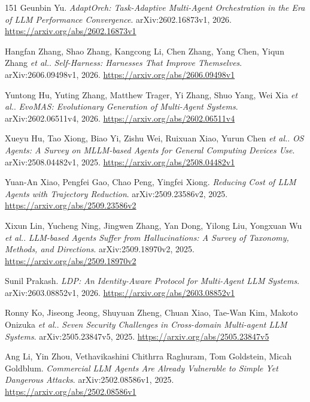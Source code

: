 \documentclass[11pt,a4paper]{article}
\begin{document}
\begin{thebibliography}{151}
Geunbin Yu.
\newblock \emph{AdaptOrch: Task-Adaptive Multi-Agent Orchestration in the Era of LLM Performance Convergence}.
\newblock arXiv:2602.16873v1, 2026.
\newblock \url{https://arxiv.org/abs/2602.16873v1}

Hangfan Zhang, Shao Zhang, Kangcong Li, Chen Zhang, Yang Chen, Yiqun Zhang \emph{et al.}.
\newblock \emph{Self-Harness: Harnesses That Improve Themselves}.
\newblock arXiv:2606.09498v1, 2026.
\newblock \url{https://arxiv.org/abs/2606.09498v1}

Yuntong Hu, Yuting Zhang, Matthew Trager, Yi Zhang, Shuo Yang, Wei Xia \emph{et al.}.
\newblock \emph{EvoMAS: Evolutionary Generation of Multi-Agent Systems}.
\newblock arXiv:2602.06511v4, 2026.
\newblock \url{https://arxiv.org/abs/2602.06511v4}

Xueyu Hu, Tao Xiong, Biao Yi, Zishu Wei, Ruixuan Xiao, Yurun Chen \emph{et al.}.
\newblock \emph{OS Agents: A Survey on MLLM-based Agents for General Computing Devices Use}.
\newblock arXiv:2508.04482v1, 2025.
\newblock \url{https://arxiv.org/abs/2508.04482v1}

Yuan-An Xiao, Pengfei Gao, Chao Peng, Yingfei Xiong.
\newblock \emph{Reducing Cost of LLM Agents with Trajectory Reduction}.
\newblock arXiv:2509.23586v2, 2025.
\newblock \url{https://arxiv.org/abs/2509.23586v2}

Xixun Lin, Yucheng Ning, Jingwen Zhang, Yan Dong, Yilong Liu, Yongxuan Wu \emph{et al.}.
\newblock \emph{LLM-based Agents Suffer from Hallucinations: A Survey of Taxonomy, Methods, and Directions}.
\newblock arXiv:2509.18970v2, 2025.
\newblock \url{https://arxiv.org/abs/2509.18970v2}

Sunil Prakash.
\newblock \emph{LDP: An Identity-Aware Protocol for Multi-Agent LLM Systems}.
\newblock arXiv:2603.08852v1, 2026.
\newblock \url{https://arxiv.org/abs/2603.08852v1}

Ronny Ko, Jiseong Jeong, Shuyuan Zheng, Chuan Xiao, Tae-Wan Kim, Makoto Onizuka \emph{et al.}.
\newblock \emph{Seven Security Challenges in Cross-domain Multi-agent LLM Systems}.
\newblock arXiv:2505.23847v5, 2025.
\newblock \url{https://arxiv.org/abs/2505.23847v5}

Ang Li, Yin Zhou, Vethavikashini Chithrra Raghuram, Tom Goldstein, Micah Goldblum.
\newblock \emph{Commercial LLM Agents Are Already Vulnerable to Simple Yet Dangerous Attacks}.
\newblock arXiv:2502.08586v1, 2025.
\newblock \url{https://arxiv.org/abs/2502.08586v1}


\end{thebibliography}
\end{document}
